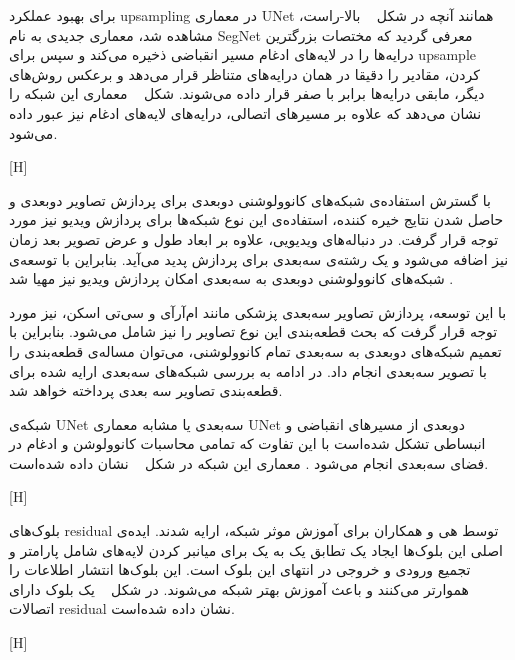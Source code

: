 برای بهبود عملکرد upsampling در معماری UNet همانند آنچه در شکل ~ بالا-راست، مشاهده شد، معماری جدیدی به نام SegNet معرفی گردید  که مختصات بزرگترین درایه‌ها را در لایه‌های ادغام مسیر انقباضی ذخیره می‌کند و سپس برای upsample کردن، مقادیر را دقیقا در همان درایه‌های متناظر قرار می‌دهد و برعکس روش‌های دیگر، مابقی درایه‌ها برابر با صفر قرار داده می‌شوند. شکل ~ معماری این شبکه را نشان می‌دهد که علاوه بر مسیرهای اتصالی، درایه‌های لایه‌های ادغام نیز عبور داده می‌شود.

[H]

با گسترش استفاده‌ی شبکه‌های کانوولوشنی دوبعدی برای پردازش تصاویر دوبعدی و حاصل شدن نتایج خیره کننده، استفاده‌ی این نوع شبکه‌ها برای پردازش ویدیو نیز مورد توجه قرار گرفت. در دنباله‌های ویدیویی، علاوه بر ابعاد طول و عرض تصویر بعد زمان نیز اضافه می‌شود و یک رشته‌ی سه‌بعدی برای پردازش پدید می‌آید. بنابراین با توسعه‌ی شبکه‌های کانوولوشنی دو‌بعدی به سه‌بعدی امکان پردازش ویدیو نیز مهیا شد .

با این توسعه، پردازش تصاویر سه‌بعدی پزشکی مانند ام‌آرآی و سی‌تی اسکن، نیز مورد توجه قرار گرفت که بحث قطعه‌بندی این نوع تصاویر را نیز شامل می‌شود. بنابراین با تعمیم شبکه‌های دوبعدی به سه‌بعدی تمام کانوولوشنی، می‌توان مساله‌ی قطعه‌بندی را با تصویر سه‌بعدی انجام داد. در ادامه به بررسی شبکه‌های سه‌بعدی ارایه شده برای قطعه‌بندی تصاویر سه بعدی پرداخته خواهد شد.

شبکه‌ی UNet سه‌بعدی یا  مشابه معماری UNet دوبعدی از مسیر‌های انقباضی و انبساطی تشکل‌ شده‌است با این تفاوت که تمامی محاسبات کانوولوشن و ادغام در فضای سه‌بعدی انجام می‌شود . معماری این شبکه در شکل ~ نشان داده شده‌است.

[H]

بلوک‌های residual توسط هی و همکاران  برای آموزش موثر شبکه، ارایه شدند. ایده‌ی اصلی این بلوک‌ها ایجاد یک تطابق یک‌ به یک برای میانبر کردن لایه‌های شامل پارامتر و تجمیع ورودی و خروجی در انتهای این بلوک است. این بلوک‌ها انتشار اطلاعات را هموارتر می‌کنند و باعث آموزش بهتر شبکه می‌شوند. در شکل ~ یک بلوک دارای اتصالات residual نشان داده شده‌است.

[H]

